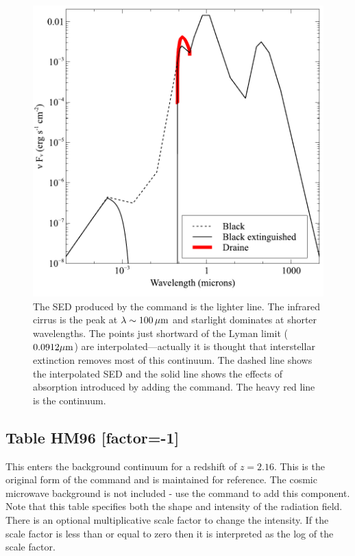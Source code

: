 \begin{figure}
\centering
\includegraphics{ism_background}
\caption[ISM radiation field]
{\label{fig:ISM_background}The SED produced by the  command is the lighter
line.
The infrared cirrus is the peak at $\lambda \sim  100\, \hbox{$\mu$m} $ and starlight
dominates at shorter wavelengths.
The points just shortward of the Lyman
limit ($0.0912 \hbox{$\mu$m}$) are interpolated---actually it is thought that interstellar
extinction removes most of this continuum.
The dashed line shows the
interpolated SED and the solid line shows the effects of absorption
introduced by adding the  command.
The heavy red line is the  continuum. }
\end{figure}

\subsection{Table HM96 [factor=-1]}

This enters the \citet{Haardt1996} background continuum for a redshift
of $z = 2.16$.  This is the original form of the command and is maintained
for reference.  The cosmic microwave background is not included - use the
 command to add this component.  Note that
this table specifies both the shape and intensity of the radiation field.
There
is an optional multiplicative scale factor to change the intensity.  If
the scale factor is less than or equal to zero then it is interpreted as
the log of the scale factor.


